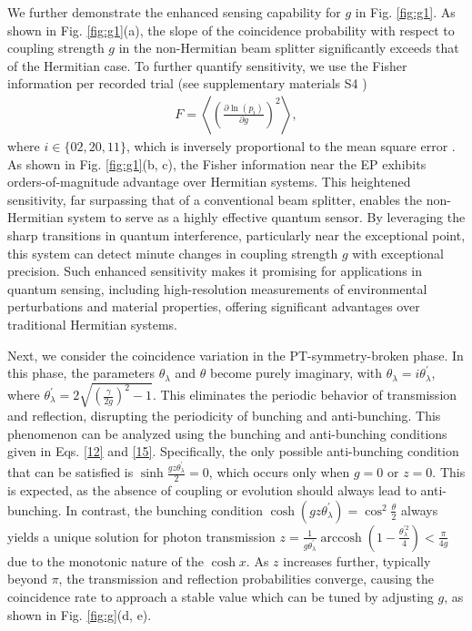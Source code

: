 \documentclass[%
reprint,
superscriptaddress,
amsthm,amsmath,amssymb,
aps,
]{revtex4-1}
\begin{document}
We further demonstrate the enhanced sensing capability for $g$ in Fig. \ref{fig:g1}. As shown in Fig. \ref{fig:g1}(a), the slope of the coincidence probability with respect to coupling strength $g$ in the non-Hermitian beam splitter significantly exceeds that of the Hermitian case. To further quantify sensitivity, we use the Fisher information per recorded trial (see supplementary materials S4 \cite{SupplementalMaterial})
\begin{eqnarray} 
	F = \left\langle \left( \frac{\partial \ln(p_i)}{\partial g} \right)^2 \right\rangle ,
\end{eqnarray}
where $i \in \{02, 20, 11\}$, which is inversely proportional to the mean square error \cite{giovannetti2011advances,slussarenko2017unconditional}. As shown in Fig. \ref{fig:g1}(b, c), the Fisher information near the EP exhibits orders-of-magnitude advantage over Hermitian systems. This heightened sensitivity, far surpassing that of a conventional beam splitter, enables the non-Hermitian system to serve as a highly effective quantum sensor. By leveraging the sharp transitions in quantum interference, particularly near the exceptional point, this system can detect minute changes in coupling strength $g$ with exceptional precision. Such enhanced sensitivity makes it promising for applications in quantum sensing, including high-resolution measurements of environmental perturbations and material properties, offering significant advantages over traditional Hermitian systems.
\\
\hfill





Next, we consider the coincidence variation in the PT-symmetry-broken phase. In this phase, the parameters $\theta_{\lambda} $ and $\theta $ become purely imaginary, with $\theta_{\lambda}=i\theta^{'}_{\lambda}$, where $\theta^{'}_{\lambda}=2\sqrt{(\frac{\gamma}{2g})^2-1}$. This eliminates the periodic behavior of transmission and reflection, disrupting the periodicity of bunching and anti-bunching. This phenomenon can be analyzed using the bunching and anti-bunching conditions given in Eqs. \ref{12} and \ref{15}. Specifically, the only possible anti-bunching condition that can be satisfied is $\sinh \frac{gz\theta^{'}_{\lambda }}{2}=0 $, which occurs only when $g=0$ or $z=0$. This is expected, as the absence of coupling or evolution should always lead to anti-bunching. In contrast, the bunching condition $  \cosh (gz\theta^{'}_{\lambda})=\cos^{2} \frac{\theta}{2}$ always yields a unique solution for photon transmission $z=\frac{1}{g \theta_{\lambda}^{'}}\operatorname{arccosh}(1-\frac{\theta_{\lambda}^{'2}}{4})<\frac{\pi}{4g}$ due to the monotonic nature of the $\cosh x$. As $z$ increases further, typically beyond $\pi$, the transmission and reflection probabilities converge, causing the coincidence rate to approach a stable value which can be tuned by adjusting $g$, as shown in Fig. \ref{fig:g}(d, e). 
\end{document}
